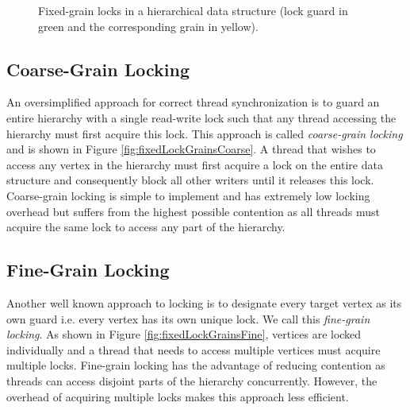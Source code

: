 \begin{figure}[H]
    \label{fig:fixedLockGrains}
\caption{Fixed-grain locks in a hierarchical data structure (lock guard in green and the corresponding grain in yellow).}
\end{figure}


\subsection{Coarse-Grain Locking}
An oversimplified approach for correct thread synchronization is to guard an entire hierarchy with a single read-write lock such that any thread accessing the hierarchy must first acquire this lock.
This approach is called \emph{coarse-grain locking} and is shown in Figure \ref{fig:fixedLockGrainsCoarse}.
A thread that wishes to access any vertex in the hierarchy must first acquire a lock on the entire data structure and consequently block all other writers until it releases this lock. 
Coarse-grain locking is simple to implement and has extremely low locking overhead but suffers from the highest possible contention as all threads must acquire the same lock to access any part of the hierarchy. 


\subsection{Fine-Grain Locking}
Another well known approach to locking is to designate every target vertex as its own guard i.e. every vertex has its own unique lock. 
We call this \emph{fine-grain locking}.
As shown in Figure \ref{fig:fixedLockGrainsFine}, vertices are locked individually and a thread that needs to access multiple vertices must acquire multiple locks. 
Fine-grain locking has the advantage of reducing contention as threads can access disjoint parts of the hierarchy concurrently. 
However, the overhead of acquiring multiple locks makes this approach less efficient. 





